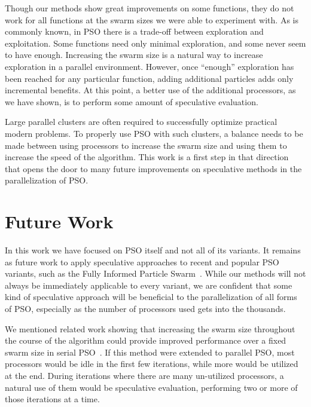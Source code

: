 \documentclass[smallcondensed]{svjour3}
\begin{document}
Though our methods show great improvements on some functions, they do not work
for all functions at the swarm sizes we were able to experiment with.  As is
commonly known, in PSO there is a trade-off between exploration and
exploitation.  Some functions need only minimal exploration, and some never
seem to have enough.  Increasing the swarm size is a natural way to increase
exploration in a parallel environment.  However, once ``enough'' exploration
has been reached for any particular function, adding additional particles adds
only incremental benefits.  At this point, a better use of the additional
processors, as we have shown, is to perform some amount of speculative
evaluation.

Large parallel clusters are often required to successfully optimize practical
modern problems.  To properly use PSO with such clusters, a balance needs to be
made between using processors to increase the swarm size and using them to
increase the speed of the algorithm.  This work is a first step in that
direction that opens the door to many future improvements on speculative
methods in the parallelization of PSO.

\section{Future Work}
\label{sec:future}

In this work we have focused on PSO itself and not all of its variants.  It
remains as future work to apply speculative approaches to recent and popular
PSO variants, such as the Fully Informed Particle
Swarm~\citep{mendes-2004-fully-informed-particle-swarm}.  While our methods
will not always be immediately applicable to every variant, we are confident
that some kind of speculative approach will be beneficial to the
parallelization of all forms of PSO, especially as the number of processors
used gets into the thousands.

We mentioned related work showing that increasing the swarm size throughout the
course of the algorithm could provide improved performance over a fixed swarm
size in serial PSO~\citep{montes-de-oca-2010-incremental-social-learning-pso}.
If this method were extended to parallel PSO, most processors would be idle in
the first few iterations, while more would be utilized at the end.  During
iterations where there are many un-utilized processors, a natural use of them
would be speculative evaluation, performing two or more of those iterations at
a time.
\end{document}

